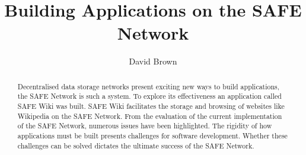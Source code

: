\documentclass{l4proj}
\begin{document}
\title{Building Applications on the SAFE Network}
\author{David Brown}
\maketitle

\begin{abstract}

Decentralised data storage networks present exciting new ways to build applications, the SAFE Network is such a system. To explore its effectiveness an application called SAFE Wiki was built. SAFE Wiki facilitates the storage and browsing of websites like Wikipedia on the SAFE Network. From the evaluation of the current implementation of the SAFE Network, numerous issues have been highlighted. The rigidity of how applications must be built presents challenges for software development. Whether these challenges can be solved dictates the ultimate success of the SAFE Network.

\end{abstract}

\educationalconsent

\tableofcontents








\printbibliography
\end{document}

